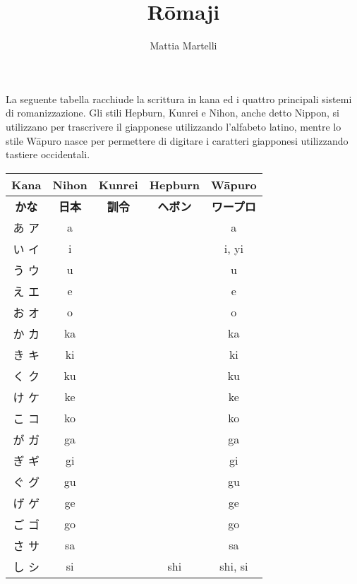 \documentclass{article}
\title{R\={o}maji}
\author{Mattia Martelli}
\date{}
\begin{document}
    \maketitle

    La seguente tabella racchiude la scrittura in kana ed i quattro principali sistemi di romanizzazione. Gli stili
    Hepburn, Kunrei e Nihon, anche detto Nippon, si utilizzano per trascrivere il giapponese utilizzando l'alfabeto
    latino, mentre lo stile W\={a}puro nasce per permettere di digitare i caratteri giapponesi utilizzando tastiere
    occidentali.

        \begin{center}
            \begin{japanese}
            \begin{longtable}{|c|c c c|c|}
                \hline
                \textitalian{\textbf{Kana}} & \textitalian{\textbf{Nihon}} & \textitalian{\textbf{Kunrei}} & \textitalian{\textbf{Hepburn}} & \textitalian{\textbf{Wāpuro}} \\ \hline
                \textbf{かな} & \textbf{日本} & \textbf{訓令} & \textbf{ヘボン} & \textbf{ワープロ} \\ \hline\hline
                あ ア & a &&& a \\ \hline
                い イ & i &&& i, yi \\ \hline
                う ウ & u &&& u \\ \hline
                え エ & e &&& e \\ \hline
                お オ & o &&& o \\ \hline
                か カ & ka &&& ka \\ \hline
                き キ & ki &&& ki \\ \hline
                く ク & ku &&& ku \\ \hline
                け ケ & ke &&& ke \\ \hline
                こ コ & ko &&& ko \\ \hline
                が ガ & ga &&& ga \\ \hline
                ぎ ギ & gi &&& gi \\ \hline
                ぐ グ & gu &&& gu \\ \hline
                げ ゲ & ge &&& ge \\ \hline
                ご ゴ & go &&& go \\ \hline
                さ サ & sa &&& sa \\ \hline
                し シ & si && shi & shi, si \\ \hline

\end{longtable}
\end{japanese}
\end{center}
\end{document}
